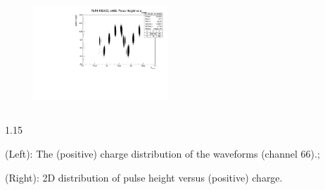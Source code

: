 \documentclass{beamer}
\begin{document}
\begin{frame}
\begin{columns}
    \end{columns}
    \vspace{-2mm}
    \begin{figure}[!h]
        \centering
        \includegraphics[width =0.45\textwidth]{figures/pdf/phtmean1.pdf}
        \label{fig:anglesinmuon}
    \end{figure}
    \vspace{-2mm}
            \begin{columns}
                \begin{column}{1.15\framewidth}
                    \setlength{\leftmargini}{1.em}
                    \begin{itemize}
    
          {\small  \item (Left): The (positive) charge distribution of the waveforms (channel 66).;
            \item (Right): 2D distribution of pulse height versus (positive) charge. }
        \end{itemize}
    \end{column}
    \end{columns}
    \end{frame}
\end{document}
